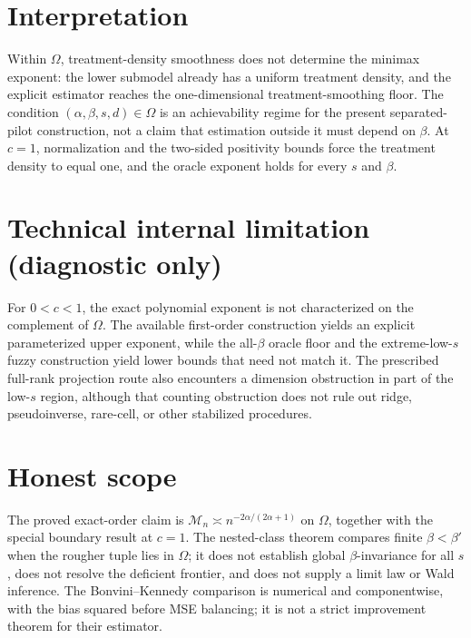 \documentclass{article}
\begin{document}
\section{Interpretation}

Within \(\Omega\), treatment-density smoothness does not determine the minimax exponent: the lower submodel already has a uniform treatment density, and the explicit estimator reaches the one-dimensional treatment-smoothing floor. The condition \((\alpha,\beta,s,d)\in\Omega\) is an achievability regime for the present separated-pilot construction, not a claim that estimation outside it must depend on \(\beta\). At \(c=1\), normalization and the two-sided positivity bounds force the treatment density to equal one, and the oracle exponent holds for every \(s\) and \(\beta\).

\section*{Technical internal limitation (diagnostic only)}

For \(0<c<1\), the exact polynomial exponent is not characterized on the complement of \(\Omega\). The available first-order construction yields an explicit parameterized upper exponent, while the all-\(\beta\) oracle floor and the extreme-low-\(s\) fuzzy construction yield lower bounds that need not match it. The prescribed full-rank projection route also encounters a dimension obstruction in part of the low-\(s\) region, although that counting obstruction does not rule out ridge, pseudoinverse, rare-cell, or other stabilized procedures.

\section{Honest scope}

The proved exact-order claim is \(\mathcal M_n\asymp n^{-2\alpha/(2\alpha+1)}\) on \(\Omega\), together with the special boundary result at \(c=1\). The nested-class theorem compares finite \(\beta<\beta'\) when the rougher tuple lies in \(\Omega\); it does not establish global \(\beta\)-invariance for all \(s\), does not resolve the deficient frontier, and does not supply a limit law or Wald inference. The Bonvini--Kennedy comparison is numerical and componentwise, with the bias squared before MSE balancing; it is not a strict improvement theorem for their estimator.
\end{document}
